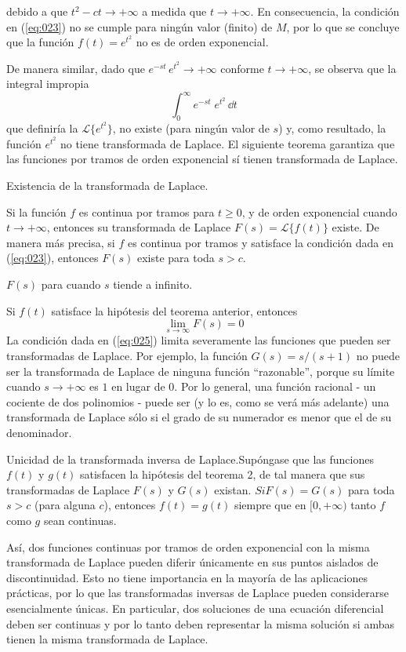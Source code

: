 debido a que $t^{2} - ct \to + \infty$ a medida que $t \to + \infty$. En consecuencia, la condición en (\ref{eq:023}) no se cumple para ningún valor (finito) de $M$, por lo que se concluye que la función $f(t) = e^{t^{2}}$ no es de orden exponencial.
\par
De manera similar, dado que $e^{-st} \, e^{t^{2}} \to + \infty$ conforme $t \to + \infty$, se observa que la integral impropia 
\[ \int_{0}^{\infty} e^{-st} \; e^{t^{2}} \, \dd t \]
que definiría la $\mathscr{L} \{ e^{t^{2}} \}$, no existe (para ningún valor de $s$) y, como resultado, la función $e^{t^{2}}$ no tiene transformada de Laplace. El siguiente teorema garantiza que las funciones por tramos de orden exponencial sí tienen transformada de Laplace.
\begin{teo}{Existencia de la transformada de Laplace.}

 Si la función $f$ es continua por tramos para $t \geq 0$, y de orden exponencial cuando $t \to +\infty$, entonces su transformada de Laplace $F(s) = \mathscr{L} \{ f(t) \}$ existe. De manera más precisa, si $f$ es continua por tramos y satisface la condición dada en (\ref{eq:023}), entonces $F(s)$ existe para toda $s > c$.
\end{teo}
\begin{cor}{$F(s)$ para cuando $s$ tiende a infinito.}

Si $f(t)$ satisface la hipótesis del teorema anterior, entonces
\begin{equation}
\lim_{s \to \infty} F(s) = 0
\label{eq:025}
\end{equation}
La condición dada en (\ref{eq:025}) limita severamente las funciones que pueden ser transformadas de Laplace. Por ejemplo, la función $G(s) = s / (s + 1)$ no puede ser la transformada de Laplace de ninguna función \enquote{razonable}, porque su límite cuando $s \to +\infty$ es $1$ en lugar de $0$. Por lo general, una función racional - un cociente de dos polinomios - puede ser (y lo es, como se verá más adelante) una transformada de Laplace sólo si el grado de su numerador es menor que el de su denominador.
\end{cor}
\begin{teo}{Unicidad de la transformada inversa de Laplace.}Supóngase que las funciones $f(t)$ y $g(t)$ satisfacen la hipótesis del teorema 2, de tal manera que sus transformadas de Laplace $F(s)$ y $G(s)$ existan. $Si F(s) = G(s)$ para toda $s > c$ (para alguna $c$), entonces $f(t) = g(t)$ siempre que en $[0, + \infty)$ tanto $f$ como $g$ sean continuas.
\end{teo}
Así, dos funciones continuas por tramos de orden exponencial con la misma transformada de Laplace pueden diferir únicamente en sus puntos aislados de discontinuidad. Esto no tiene importancia en la mayoría de las aplicaciones prácticas, por lo que las transformadas inversas de Laplace pueden considerarse esencialmente únicas. En particular, dos soluciones de una ecuación diferencial deben ser continuas y por lo tanto deben representar la misma solución si ambas tienen la misma transformada de Laplace.
